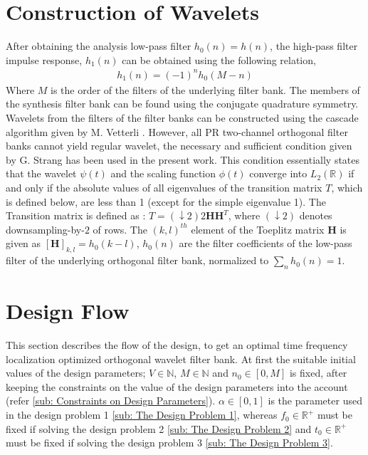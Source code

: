 \section{Construction of Wavelets}
\label{sec: Construction of wavelets}
After obtaining the analysis low-pass filter $h_0(n) = h(n)$, the high-pass filter impulse response, $h_1(n)$ can be obtained using the following relation,
\begin{eqnarray}
h_1(n) = (-1)^n h_0(M-n)
\end{eqnarray}
Where $M$ is the order of the filters of the underlying filter bank. The members of the synthesis filter bank can be found using the conjugate quadrature symmetry. Wavelets from the filters of the filter banks can be constructed using the cascade algorithm given by M. Vetterli \cite{key-12}. However, all PR two-channel orthogonal filter banks cannot yield regular wavelet, the necessary and sufficient condition given by G. Strang \cite{key-45} has been used in the present work. This condition essentially states that the wavelet $\psi(t)$ and the scaling function $\phi(t)$ converge into $L_{2}(\mathbb{R})$ if and only if the absolute values of all eigenvalues of the transition matrix $T$, which is defined below, are less than 1 (except for the simple eigenvalue 1). The Transition matrix is defined as : $T=\left(\downarrow2\right)2\mathbf{HH}^{T}$, where $\left(\downarrow2\right)$ denotes downsampling-by-$2$ of rows. The $(k,l)^{th}$ element of the Toeplitz matrix $\mathbf{H}$ is given as $[\mathbf{H}]_{k,l}=h_{0}(k-l)$, $h_{0}(n)$ are the filter coefficients of the low-pass filter of the underlying orthogonal filter bank, normalized to $\sum_{n}h_{0}(n)=1$.

\section{Design Flow}
\label{Design Flow}
This section describes the flow of the design, to get an optimal time frequency localization optimized orthogonal wavelet filter bank. At first the suitable initial values of the design parameters; $V \in \mathbb{N}$, $M \in \mathbb{N}$ and $n_0 \in [0,M]$ is fixed, after keeping the constraints on the value of the design parameters into the account (refer \ref{sub: Constraints on Design Parameters}). $\alpha \in [0,1]$ is the parameter used in the design problem 1 \ref{sub: The Design Problem 1}, whereas $f_0 \in \mathbb{R^+}$ must be fixed if solving the design problem 2 \ref{sub: The Design Problem 2} and $t_0 \in \mathbb{R^+}$ must be fixed if solving the design problem 3 \ref{sub: The Design Problem 3}.  

